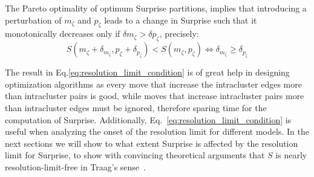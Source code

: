 
The Pareto optimality of optimum Surprise partitions, implies that introducing a perturbation of $m_\zeta$ and $p_\zeta$ leads to a change in Surprise such that it monotonically decreases only if $\delta m_\zeta > \delta p_\zeta$, precisely:
\begin{equation}\label{eq:resolution_limit_condition}
S(m_\zeta + \delta_{m_\zeta}, p_\zeta + \delta_{p_\zeta}) < S(m_\zeta,p_\zeta) \iff \delta_{m_\zeta} \geq \delta_{p_\zeta}
\end{equation}

The result in Eq.\ref{eq:resolution_limit_condition} is of great help in designing optimization algorithms as every move that increase the intracluster edges more than intracluster pairs is good, while moves that increase intracluster pairs more than intracluster edges must be ignored, therefore sparing time for the computation of Surprise. Additionally, Eq.~\ref{eq:resolution_limit_condition} is useful when analyzing the onset of the resolution limit for different models.
In the next sections we will show to what extent Surprise is affected by the resolution limit for Surprise, to show with convincing theoretical arguments that $S$ is nearly resolution-limit-free in Traag's sense~\cite{traag2015}.


